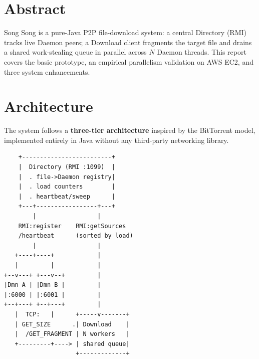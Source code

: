 \documentclass[10pt,twocolumn,a4paper]{article}
\begin{document}

\section*{Abstract}

Song Song is a pure-Java P2P file-download system: a central Directory (RMI) tracks live Daemon peers; a Download client fragments the target file and drains a shared work-stealing queue in parallel across $N$ Daemon threads. This report covers the basic prototype, an empirical parallelism validation on AWS EC2, and three system enhancements.

\section{Architecture}

The system follows a \textbf{three-tier architecture} inspired by the BitTorrent model, implemented entirely in Java without any third-party networking library.

{\scriptsize
\begin{verbatim}
    +-------------------------+
    |  Directory (RMI :1099)  |
    |  . file->Daemon registry|
    |  . load counters        |
    |  . heartbeat/sweep      |
    +---+-----------------+---+
        |                 |
    RMI:register    RMI:getSources
    /heartbeat      (sorted by load)
        |                 |
   +----+----+            |
   |         |            |
+--v---+ +---v--+         |
|Dmn A | |Dmn B |         |
|:6000 | |:6001 |         | 
+--+---+ +--+---+         | 
   |  TCP:   |      +-----v-------+
   | GET_SIZE      .| Download    |
   |  /GET_FRAGMENT | N workers   |
   +---------+----> | shared queue|
                    +-------------+
\end{verbatim}     
}
\end{document}
